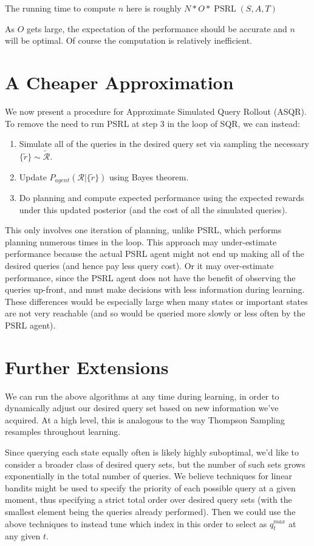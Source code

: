 \documentclass{article}
\begin{document}
The running time to compute $n$ here is roughly $N * O * \mathop{PSRL}(S, A, T) $

As $O$ gets large, the expectation of the performance should be accurate and $n$ will be optimal. Of course the computation is relatively inefficient. 

\section{A Cheaper Approximation}
We now present a procedure for Approximate Simulated Query Rollout (ASQR).
To remove the need to run PSRL at step 3 in the loop of SQR, we can instead:

\begin{enumerate}
\item Simulate all of the queries in the desired query set via sampling the necessary $\{\tilde{r}\} \sim \tilde{\mathcal{R}}$.
\item Update $P_{agent} (\mathcal{R} | \{\tilde{r}\})$ using Bayes theorem.
\item Do planning and compute expected performance using the expected rewards under this updated posterior (and the cost of all the simulated queries).
\end{enumerate}

This only involves one iteration of planning, unlike PSRL, which performs planning numerous times in the loop.
This approach may under-estimate performance because the actual PSRL agent might not end up making all of the desired queries (and hence pay less query cost).
Or it may over-estimate performance, since the PSRL agent does not have the benefit of observing the queries up-front, and must make decisions with less information during learning.
These differences would be especially large when many states or important states are not very reachable (and so would be queried more slowly or less often by the PSRL agent).

\section{Further Extensions}
We can run the above algorithms at any time during learning, in order to dynamically adjust our desired query set based on new information we've acquired.
At a high level, this is analogous to the way Thompson Sampling resamples throughout learning.

Since querying each state equally often is likely highly suboptimal, we'd like to consider a broader class of desired query sets, but the number of such sets grows exponentially in the total number of queries.
We believe techniques for linear bandits might be used to specify the priority of each possible query at a given moment, thus specifying a strict total order over desired query sets (with the smallest element being the queries already performed).
Then we could use the above techniques to instead tune which index in this order to select as $q^{max}_t$ at any given $t$.
\end{document}
